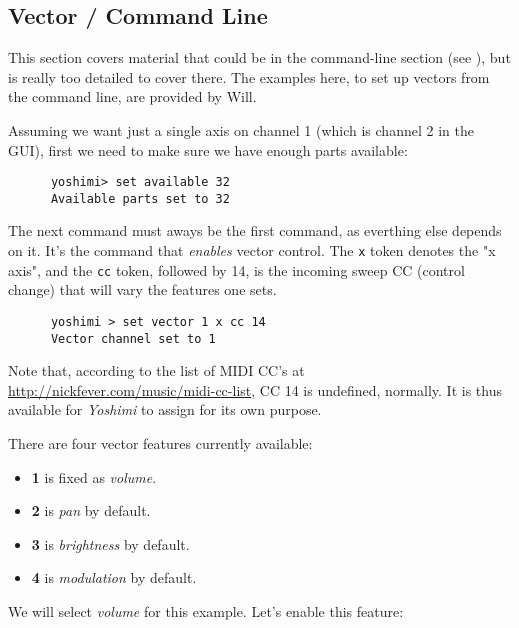 \subsection{Vector / Command Line}
\label{subsection:vector_command_line}

   This section covers material that could be in the command-line section
   (see ), but is really too detailed to cover
   there.  The examples here, to set up vectors from the command line,
   are provided by Will.

   Assuming we want just a single axis on channel 1 (which is channel
   2 in the GUI), first we need to make sure we have enough parts available:

   \begin{verbatim}
      yoshimi> set available 32
      Available parts set to 32
   \end{verbatim}

   The next command must aways be the first command, as everthing else depends
   on it. It's the command that \textsl{enables} vector control.  The
   \texttt{x} token denotes the "x axis", and the \texttt{cc} token, followed
   by 14, is the incoming sweep CC (control change) that will vary the
   features one sets.

   \begin{verbatim}
      yoshimi > set vector 1 x cc 14
      Vector channel set to 1
   \end{verbatim}

   Note that, according to the list of MIDI CC's at
   \url{http://nickfever.com/music/midi-cc-list}, CC 14 is undefined,
   normally.  It is thus available for \textsl{Yoshimi} to assign
   for its own purpose.

   There are four vector features currently available:

   \begin{itemize}
      \item \textbf{1} is fixed as \textsl{volume}.
      \item \textbf{2} is \textsl{pan} by default.
      \item \textbf{3} is \textsl{brightness} by default.
      \item \textbf{4} is \textsl{modulation} by default.
   \end{itemize}

   We will select \textsl{volume} for this example.  Let's enable this
   feature:

